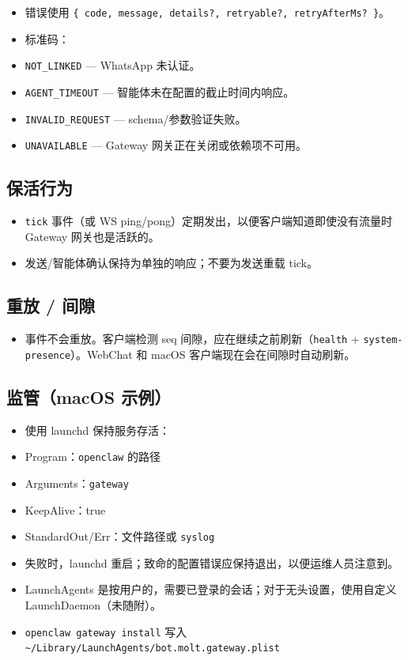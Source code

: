 \begin{itemize}
  \item 错误使用 \texttt{\{ code, message, details?, retryable?, retryAfterMs? \}}。
  \item 标准码：
  \item \texttt{NOT\_LINKED} — WhatsApp 未认证。
  \item \texttt{AGENT\_TIMEOUT} — 智能体未在配置的截止时间内响应。
  \item \texttt{INVALID\_REQUEST} — schema/参数验证失败。
  \item \texttt{UNAVAILABLE} — Gateway 网关正在关闭或依赖项不可用。
\end{itemize}


\subsection{保活行为}


\begin{itemize}
  \item \texttt{tick} 事件（或 WS ping/pong）定期发出，以便客户端知道即使没有流量时 Gateway 网关也是活跃的。
  \item 发送/智能体确认保持为单独的响应；不要为发送重载 tick。
\end{itemize}


\subsection{重放 / 间隙}


\begin{itemize}
  \item 事件不会重放。客户端检测 seq 间隙，应在继续之前刷新（\texttt{health} + \texttt{system-presence}）。WebChat 和 macOS 客户端现在会在间隙时自动刷新。
\end{itemize}


\subsection{监管（macOS 示例）}


\begin{itemize}
  \item 使用 launchd 保持服务存活：
  \item Program：\texttt{openclaw} 的路径
  \item Arguments：\texttt{gateway}
  \item KeepAlive：true
  \item StandardOut/Err：文件路径或 \texttt{syslog}
  \item 失败时，launchd 重启；致命的配置错误应保持退出，以便运维人员注意到。
  \item LaunchAgents 是按用户的，需要已登录的会话；对于无头设置，使用自定义 LaunchDaemon（未随附）。
  \item \texttt{openclaw gateway install} 写入 \texttt{\textasciitilde{}/Library/LaunchAgents/bot.molt.gateway.plist}
\end{itemize}

